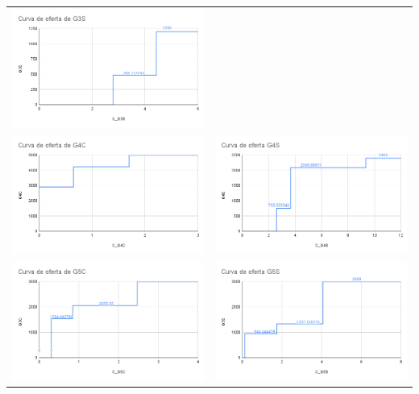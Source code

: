 \documentclass[
]{article}
\begin{document}
\begin{longtable}[]{@{}cc@{}}
\includegraphics[width=3.125in,height=\textheight]{img/G3S.png} \\
\includegraphics[width=3.125in,height=\textheight]{img/G4C.png} &
\includegraphics[width=3.125in,height=\textheight]{img/G4S.png} \\
\includegraphics[width=3.125in,height=\textheight]{img/G5C.png} &
\includegraphics[width=3.125in,height=\textheight]{img/G5S.png} \\
\bottomrule
\end{longtable}
\end{document}
